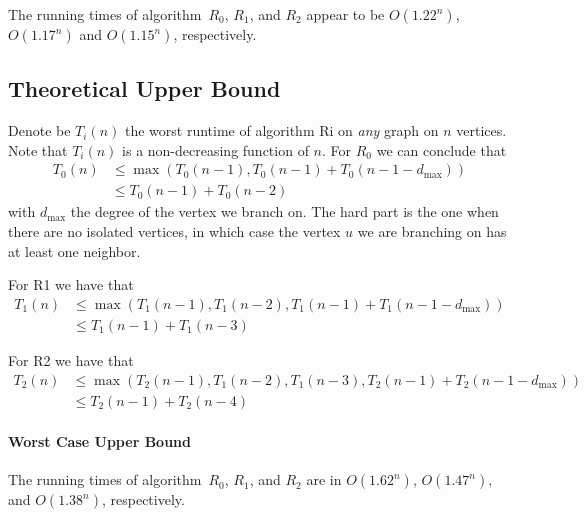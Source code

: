 \documentclass{tufte-handout}
\begin{document}
The running times of algorithm~$R_0$, $R_1$, and $R_2$ appear to be
$O(1.22^n)$, $O(1.17^n)$ and $O(1.15^n)$, respectively.

\subsection{Theoretical Upper Bound}

Denote be $T_i(n)$ the worst runtime of algorithm Ri on \emph{any} graph on $n$ vertices.
Note that $T_i(n)$ is a non-decreasing function of $n$.
For $R_0$ we can conclude that
\begin{align*}
T_0(n) &\leq\max(T_0(n-1), T_0(n-1)+T_0(n-1-d_{\mbox{max}})) \\ &\leq T_0(n-1)+T_0(n-2)
\end{align*}
with $d_{\mbox{max}}$ the degree of the vertex we branch on. The hard part is the one when there are no isolated vertices, in which case the vertex $u$ we are branching on has at least one neighbor. 

For R1 we have that
\begin{align*}
T_1(n) &\leq\max(T_1(n-1), T_1(n-2), T_1(n-1)+T_1(n-1-d_{\mbox{max}})) \\ &\leq T_1(n-1)+T_1(n-3)
\end{align*}

For R2 we have that
\begin{align*}
T_2(n) &\leq\max(T_2(n-1), T_1(n-2), T_1(n-3), T_2(n-1)+T_2(n-1-d_{\mbox{max}})) \\ &\leq T_2(n-1)+T_2(n-4)
\end{align*}
\paragraph{Worst Case Upper Bound}
The running times of algorithm~$R_0$, $R_1$, and $R_2$ are in
$O(1.62^n)$, $O(1.47^n),$ and $O(1.38^n)$, respectively. \newpage
\end{document}
